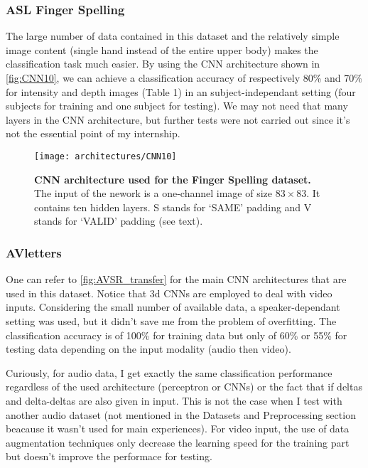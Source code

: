 \subsubsection{ASL Finger Spelling}

The large number of data contained in this dataset and the relatively
simple image content (single hand instead of the entire upper body)
makes the classification task much easier. By using the CNN architecture
shown in \autoref{fig:CNN10}, we can achieve a classification accuracy
of respectively 80\% and 70\% for intensity and depth images (Table 1)
in an subject-independant setting (four subjects for training and one
subject for testing). We may not need that many layers in the CNN
architecture, but further tests were not carried out since it's not
the essential point of my internship.

\begin{figure}[H]
  \centering
  \texttt{[image: architectures/CNN10]}
  \caption{%
    \textbf{CNN architecture used for the Finger Spelling  dataset.}
      \\[0.1em]
    The input of the nework is a one-channel image of size $83 \times 83$.
      It contains ten hidden layers. S stands for `SAME' padding
      and V stands for `VALID' padding (see text).}
  \label{fig:CNN10}
\end{figure}

\subsubsection{AVletters}

One can refer to \autoref{fig:AVSR_transfer} for the main CNN architectures
that are used in this dataset. 
Notice that 3d CNNs are employed to deal with video inputs.
Considering the small number of available data, a speaker-dependant
setting was used, but it didn't save me from the problem of overfitting.
The classification accuracy is of 100\% for training data but only
of 60\% or 55\% for testing data depending on the input modality
(audio then video).

Curiously, for audio data, I get exactly the same classification
performance regardless of the used architecture (perceptron or CNNs)
or the fact that if deltas and delta-deltas are also given in input.
This is not the case when I test with another audio dataset
(not mentioned in the Datasets and Preprocessing section beacause
it wasn't used for main experiences).
For video input, the use of data augmentation techniques only decrease
the learning speed for the training part but doesn't improve the performace
for testing.

